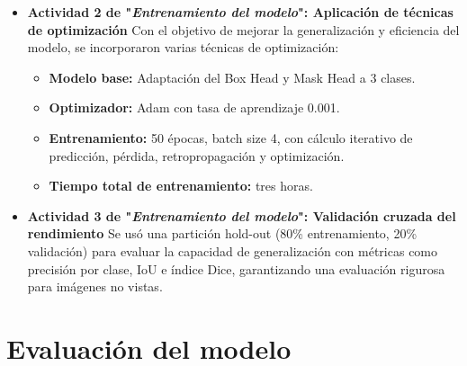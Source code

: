 \begin{enumerate}
\begin{itemize}
  
    \item \textbf{Actividad 2 de "\textit{Entrenamiento del modelo}": Aplicación de técnicas de optimización}
     Con el objetivo de mejorar la generalización y eficiencia del modelo, se incorporaron varias técnicas de optimización:
    
    \begin{itemize}
\item \textbf{Modelo base:} Adaptación del Box Head y Mask Head a 3 clases.

\item \textbf{Optimizador:} Adam con tasa de aprendizaje 0.001.

\item \textbf{Entrenamiento:} 50 épocas, batch size 4, con cálculo iterativo de predicción, pérdida, retropropagación y optimización.

\item \textbf{Tiempo total de entrenamiento:} tres horas.

  \end{itemize}
  
    \item \textbf{Actividad 3 de "\textit{Entrenamiento del modelo}": Validación cruzada del rendimiento}
    Se usó una partición hold-out (80\% entrenamiento, 20\% validación) para evaluar la capacidad de generalización con métricas como precisión por clase, IoU e índice Dice, garantizando una evaluación rigurosa para imágenes no vistas.

  
  \end{itemize}

\end{enumerate}

\clearpage
\newpage
\section{Evaluación del modelo}


